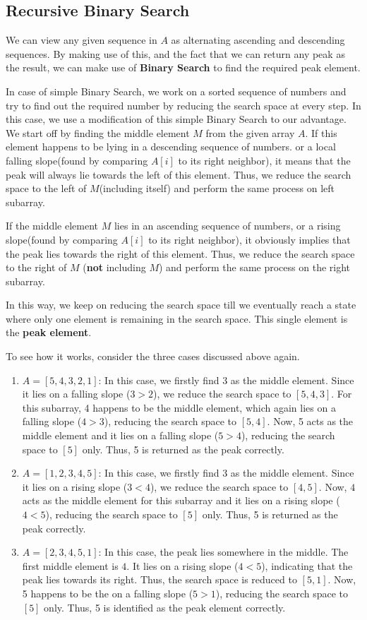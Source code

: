 \subsection{Recursive Binary Search}
We can view any given sequence in $A$ as alternating ascending and descending sequences. By making use of this, and the fact that we can return any peak as the result, we can make use of \textbf{Binary Search} to find the required peak element.
\par
In case of simple Binary Search, we work on a sorted sequence of numbers and try to find out the required number by reducing the search space at every step. In this case, we use a modification of this simple Binary Search to our advantage. We start off by finding the middle element $M$ from the given array $A$. If this element happens to be lying in a descending sequence of numbers. or a local falling slope(found by comparing $A[i]$ to its right neighbor), it means that the peak will always lie towards the left of this element. Thus, we reduce the search space to the left of $M$(including itself) and perform the same process on left subarray.
\par
If the middle element $M$ lies in an ascending sequence of numbers, or a rising slope(found by comparing $A[i]$ to its right neighbor), it obviously implies that the peak lies towards the right of this element. Thus, we reduce the search space to the right of $M$ (\textbf{not} including $M$) and perform the same process on the right subarray.
\par
In this way, we keep on reducing the search space till we eventually reach a state where only one element is remaining in the search space. This single element is the \textbf{peak element}.
\par
To see how it works, consider the three cases discussed above again.
\begin{enumerate}
\item $A=[5,4,3,2,1]$: In this case, we firstly find 3 as the middle element. Since it lies on a falling slope ($3>2$), we reduce the search space to $[5, 4, 3]$. For this subarray, 4 happens to be the middle element, which again lies on a falling slope ($4 > 3$), reducing the search space to $[5, 4]$. Now, 5 acts as the middle element and it lies on a falling slope ($5>4$), reducing the search space to $[5]$ only. Thus, 5 is returned as the peak correctly.
\item $A=[1,2,3,4,5]$:  In this case, we firstly find $3$ as the middle element. Since it lies on a rising slope ($3 < 4$), we reduce the search space to $[4, 5]$. Now, $4$ acts as the middle element for this subarray and it lies on a rising slope ($4< 5$), reducing the search space to $[5]$ only. Thus, 5 is returned as the peak correctly.
\item $A=[2,3,4,5,1]$: In this case, the peak lies somewhere in the middle. The first middle element is $4$. It lies on a rising slope ($4<5$), indicating that the peak lies towards its right. Thus, the search space is reduced to $[5, 1]$. Now, 5 happens to be the on a falling slope ($5 > 1$), reducing the search space to $[5]$ only. Thus, 5 is identified as the peak element correctly.
\end{enumerate}

